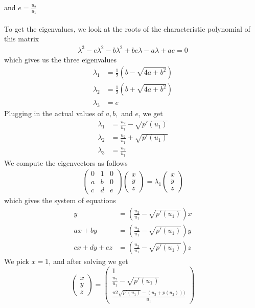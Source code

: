  and $e=\frac{u_2}{u_1}$
\\ \\
To get the eigenvalues, we look at the roots of the characteristic polynomial of this matrix 
\begin{align*}
	\lambda^3 -e \lambda^2 - b \lambda^2 + b e \lambda -a \lambda + a e = 0
\end{align*}
which gives us the three eigenvalues 
\begin{align*}
	\lambda_1 &= \frac{1}{2} (b - \sqrt{4a+b^2}) \\
	\lambda_2 &= \frac{1}{2} (b + \sqrt{4a+b^2}) \\
	\lambda_3 &= e
\end{align*}
Plugging in the actual values of $a,b,$ and $e$, we get 
\begin{align*}
	\lambda_1 &= \frac{u_2}{u_1} - \sqrt{p'(u_1)} \\
	\lambda_2 &= \frac{u_2}{u_1} + \sqrt{p'(u_1)} \\
	\lambda_3 &= \frac{u_2}{u_1}
\end{align*}
We compute the eigenvectors as follows
\begin{align*}
\begin{pmatrix}
	0 & 1 & 0 \\ 
	a & b & 0 \\ 
	c & d & e
	\end{pmatrix} \begin{pmatrix}
	x \\ y \\ z
	\end{pmatrix} = \lambda_1 \begin{pmatrix}
	x \\ y \\ z
	\end{pmatrix}
\end{align*}
which gives the system of equations
\begin{align*}
y &= (\frac{u_2}{u_1} - \sqrt{p'(u_1)}) x \\
ax + by &= (\frac{u_2}{u_1} - \sqrt{p'(u_1)}) y \\
cx + dy + ez &= (\frac{u_2}{u_1} - \sqrt{p'(u_1)}) z
\end{align*}
We pick $x = 1$, and after solving we get 
$$
\begin{pmatrix}
x \\ y \\ z
\end{pmatrix} = \begin{pmatrix}
1 \\
 \frac{u_2}{u_1} - \sqrt{p'(u_1 )} \\
 \frac{u2 \sqrt{p'(u_1)}-(u_3+p(u_2)))}{u_1} 
\end{pmatrix}
$$
